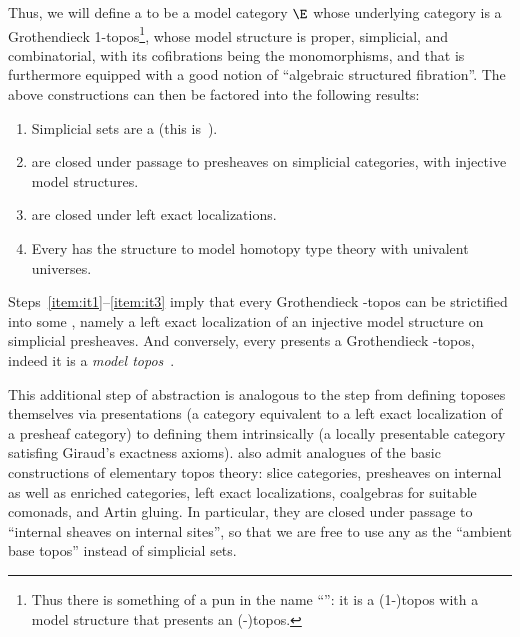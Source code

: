Thus, we will define a \emph{\ttmt} to be a model category $\E$ whose underlying category is a \slcc Grothendieck 1-topos\footnote{Thus there is something of a pun in the name ``\ttmt'': it is a (1-)topos with a model structure that presents an (\io-)topos.}, whose model structure is proper, simplicial, and combinatorial, with its cofibrations being the monomorphisms, and that is furthermore equipped with a good notion of ``algebraic structured fibration''.
The above constructions can then be factored into the following results:
\begin{enumerate}[label=(\arabic*)]
\item Simplicial sets are a \ttmt (this is~\cite{klv:ssetmodel}).\label{item:it1}
\item \Ttmts are closed under passage to presheaves on simplicial categories, with injective model structures.\label{item:it2}
\item \Ttmts are closed under left exact localizations.\label{item:it3}
\item Every \ttmt has the structure to model homotopy type theory with univalent universes.
\end{enumerate}
Steps~\ref{item:it1}--\ref{item:it3} imply that every Grothendieck \io-topos can be strictified into some \ttmt, namely a left exact localization of an injective model structure on simplicial presheaves.
And conversely, every \ttmt presents a Grothendieck \io-topos, indeed it is a \emph{model topos}~\cite{rezk:homotopy-toposes}.

This additional step of abstraction is analogous to the step from defining toposes themselves via presentations (a category equivalent to a left exact localization of a presheaf category) to defining them intrinsically (a locally presentable category satisfing Giraud's exactness axioms).
\Ttmts also admit analogues of the basic constructions of elementary topos theory: slice categories, presheaves on internal as well as enriched categories, left exact localizations, coalgebras for suitable comonads, and Artin gluing.
In particular, they are closed under passage to ``internal sheaves on internal sites'', so that we are free to use any \ttmt as the ``ambient base topos'' instead of simplicial sets.

